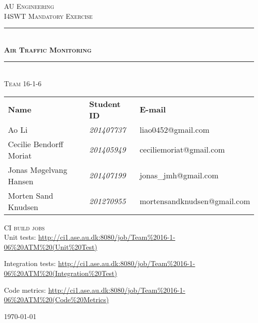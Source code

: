 \newcommand{\HRule}{\rule{\linewidth}{0.1mm}} %
\thispagestyle{empty}
\begin{center}
	\vspace{3cm}
	\textsc{\LARGE AU Engineering}\\[1.5cm] %
	
	\textsc{\large I4SWT Mandatory Exercise}\\[2.5cm] 
	\HRule \\[0.8cm]
	{\huge \bfseries \textsc{Air Traffic Monitoring}} \\[0.5cm]{\LARGE }
	\HRule \\[1.5cm]
	
	\textsc{\Large Team 16-1-6}\\
	\vspace{0.5 in}
	\begin{center}
		\begin{tabular}{l l l}
			\textbf{Name} & \textbf{Student ID} & \textbf{E-mail} \\
			Ao Li & \textsl{201407737} &  liao0452@gmail.com  \\
			Cecilie Bendorff Moriat & \textsl{201405949} & ceciliemoriat@gmail.com \\
			Jonas Møgelvang Hansen & \textsl{201407199} & jonas\_jmh@gmail.com \\
			Morten Sand Knudsen & \textsl{201270955} & mortensandknudsen@gmail.com \\
			
		\end{tabular}
	\end{center}
	\vspace{1 in}
	
	\textsc{\large CI build jobs}\\
	\vspace{0.3 in}
	Unit tests:	
	\url{http://ci1.ase.au.dk:8080/job/Team%2016-1-06%20ATM%20(Unit%20Test)}

	Integration tests:
	\url{http://ci1.ase.au.dk:8080/job/Team%2016-1-06%20ATM%20(Integration%20Test)}
		
	Code metrics:
	\url{http://ci1.ase.au.dk:8080/job/Team%2016-1-06%20ATM%20(Code%20Metrics)}
	

	\vspace{0.5 in}
	
	\textsc{\large \today}\\
	\vfill %
	
\end{center} %

\clearpage

